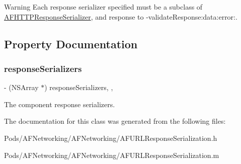 \begin{DoxyWarning}{Warning}
Each response serializer specified must be a subclass of {\ttfamily \mbox{\hyperlink{interface_a_f_h_t_t_p_response_serializer}{A\+F\+H\+T\+T\+P\+Response\+Serializer}}}, and response to {\ttfamily -\/validate\+Response\+:data\+:error\+:}. 
\end{DoxyWarning}


\subsection{Property Documentation}
\mbox{\label{interface_a_f_compound_response_serializer_aefd03c34697b76eeafca950a999f92b5}} 
\subsubsection{\texorpdfstring{response\+Serializers}{responseSerializers}}
{\footnotesize\ttfamily -\/ (N\+S\+Array $\ast$) response\+Serializers\hspace{0.3cm}{\ttfamily [read]}, {\ttfamily [nonatomic]}, {\ttfamily [copy]}}

The component response serializers. 

The documentation for this class was generated from the following files\+:\begin{DoxyCompactItemize}
\item 
Pods/\+A\+F\+Networking/\+A\+F\+Networking/A\+F\+U\+R\+L\+Response\+Serialization.\+h\item 
Pods/\+A\+F\+Networking/\+A\+F\+Networking/A\+F\+U\+R\+L\+Response\+Serialization.\+m\end{DoxyCompactItemize}
